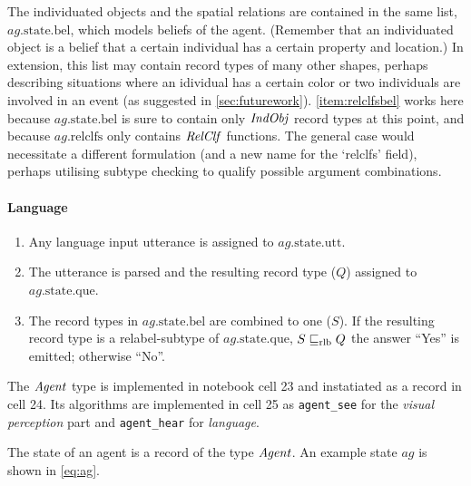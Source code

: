 The individuated objects and the spatial relations are contained in the same list, $ag.\text{state.bel}$, which models beliefs of the agent.
(Remember that an individuated object is a belief that a certain individual has a certain property and location.)
In extension, this list may contain record types of many other shapes, perhaps describing situations where an idividual has a certain color or two individuals are involved in an event (as suggested in \autoref{sec:futurework}).
\autoref{item:relclfsbel} works here because $ag.\text{state.bel}$ is sure to contain only $\mathit{IndObj}$ record types at this point, and because $ag.\text{relclfs}$ only contains $\mathit{RelClf}$ functions.
The general case would necessitate a different formulation (and a new name for the `relclfs' field), perhaps utilising subtype checking to qualify possible argument combinations.

\paragraph{Language}

\begin{enumerate}
\item Any language input utterance is assigned to $ag.\text{state.utt}$.
\item The utterance is parsed and the resulting record type ($Q$) assigned to $ag.\text{state.que}$.
\item The record types in $ag.\text{state.bel}$ are combined to one ($S$).
If the resulting record type is a relabel-subtype of $ag.\text{state.que}$, $S \mathrel{\sqsubseteq_\text{rlb}} Q$ the answer ``Yes'' is emitted; otherwise ``No''.
\end{enumerate}

The $\mathit{Agent}$ type is implemented in notebook cell 23 and instatiated as a record in cell 24.
Its algorithms are implemented in cell 25 as \texttt{agent\_see} for the \textit{visual perception} part and \texttt{agent\_hear} for \textit{language}.

The state of an agent is a record of the type $\mathit{Agent}$.
An example state $ag$ is shown in \autoref{eq:ag}.

